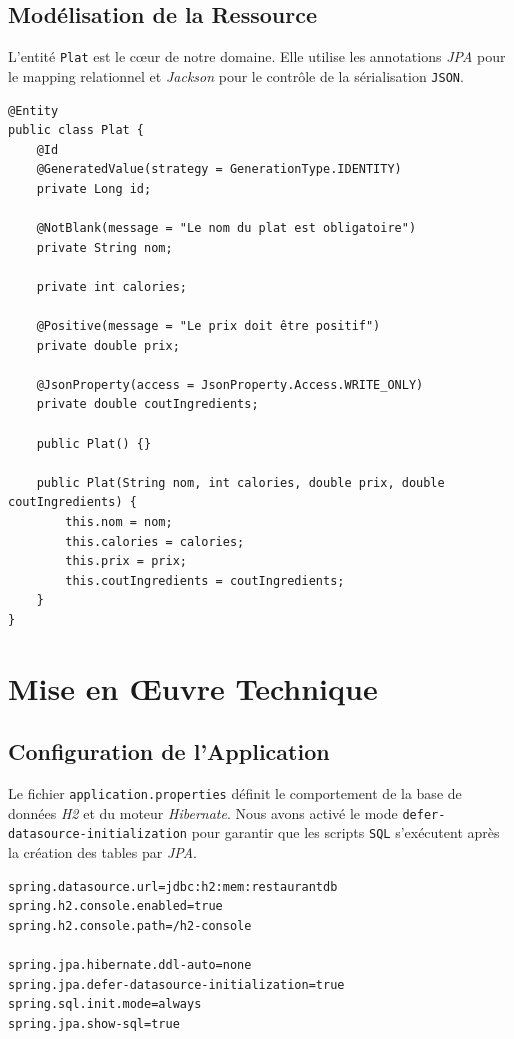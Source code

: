\documentclass[12pt,a4paper,french]{article}
\begin{document}
\subsection{Modélisation de la Ressource}
L'entité \texttt{Plat} est le c\oe{}ur de notre domaine. Elle utilise les annotations \textit{JPA} pour
le mapping relationnel et \textit{Jackson} pour le contrôle de la sérialisation \texttt{JSON}.

\begin{tcolorbox}[projectbox, title=Plat.java]
    \begin{verbatim}
@Entity
public class Plat {
    @Id
    @GeneratedValue(strategy = GenerationType.IDENTITY)
    private Long id;

    @NotBlank(message = "Le nom du plat est obligatoire")
    private String nom;

    private int calories;

    @Positive(message = "Le prix doit être positif")
    private double prix;

    @JsonProperty(access = JsonProperty.Access.WRITE_ONLY)
    private double coutIngredients;

    public Plat() {}

    public Plat(String nom, int calories, double prix, double coutIngredients) {
        this.nom = nom;
        this.calories = calories;
        this.prix = prix;
        this.coutIngredients = coutIngredients;
    }
}
\end{verbatim}
\end{tcolorbox}

\section{Mise en \OE{}uvre Technique}
\subsection{Configuration de l'Application}
Le fichier \texttt{application.properties} définit le comportement de la base de données \textit{H2} et du moteur
\textit{Hibernate}. Nous avons activé le mode \texttt{defer-datasource-initialization} pour garantir que les scripts
\texttt{SQL} s'exécutent après la création des tables par \textit{JPA}.

\begin{tcolorbox}[projectbox, title=application.properties]
    \begin{verbatim}
spring.datasource.url=jdbc:h2:mem:restaurantdb
spring.h2.console.enabled=true
spring.h2.console.path=/h2-console

spring.jpa.hibernate.ddl-auto=none
spring.jpa.defer-datasource-initialization=true
spring.sql.init.mode=always
spring.jpa.show-sql=true
\end{verbatim}
\end{tcolorbox}
\end{document}
